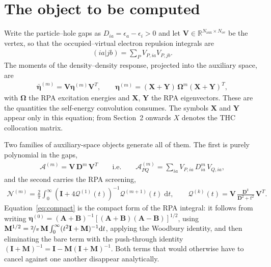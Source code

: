 \documentclass[11pt]{article}
\newcommand{\mat}[1]{{\mathbf{#1}}}
\newcommand{\parth}[1]{\left(#1\right)}
\newcommand{\Dcal}{\mathcal{A}}
\newcommand{\Qcal}{\mathcal{Q}}
\newcommand{\Ncal}{\mathcal{N}}
\begin{document}
\section{The object to be computed}

Write the particle--hole gaps as $D_{ia} = \epsilon_a - \epsilon_i > 0$ and let
$\mat{V} \in \mathbb{R}^{N_{\text{aux}} \times N_{ov}}$ be the vertex, so that the
occupied--virtual electron repulsion integrals are
\begin{align}
    (ia|jb) = \sum_P V_{P,ia} V_{P,jb}.
\end{align}
The moments of the density--density response, projected into the auxiliary space, are
\begin{align}
    \bar{\bm\eta}^{(m)} = \mat{V} \bm\eta^{(m)} \mat{V}^T,
    \qquad
    \bm\eta^{(m)} = (\mat{X}+\mat{Y})\, \bm\Omega^m (\mat{X}+\mat{Y})^T ,
\end{align}
with $\bm\Omega$ the RPA excitation energies and $\mat{X}$, $\mat{Y}$ the RPA
eigenvectors. These are the quantities the self-energy convolution consumes. The symbols
$\mat{X}$ and $\mat{Y}$ appear only in this equation; from Section~2 onwards $X$ denotes
the THC collocation matrix.

Two families of auxiliary-space objects generate all of them. The first is purely
polynomial in the gaps,
\begin{align}
    \Dcal^{(m)} = \mat{V}\, \mat{D}^m\, \mat{V}^T
    \qquad \text{i.e.} \qquad
    \Dcal^{(m)}_{PQ} = \sum_{ia} V_{P,ia}\, D_{ia}^m\, V_{Q,ia} ,
    \label{eq:Dcal}
\end{align}
and the second carries the RPA screening,
\begin{align}
    \Ncal^{(m)}
    = \frac{2}{\pi} \int_0^\infty
      \parth{\mat{I} + 4\Qcal^{(1)}(t)}^{-1} \Qcal^{(m+1)}(t) \; \mathrm{d}t ,
    \qquad
    \Qcal^{(k)}(t) = \mat{V}\, \frac{\mat{D}^{k}}{\mat{D}^2 + t^2}\, \mat{V}^T .
    \label{eq:compact}
\end{align}
Equation~\eqref{eq:compact} is the compact form of the RPA integral: it follows from
writing $\bm\eta^{(0)} = (\mat{A}+\mat{B})^{-1}[(\mat{A}+\mat{B})(\mat{A}-\mat{B})]^{1/2}$,
using $\mat{M}^{1/2} = \nicefrac{2}{\pi}\,\mat{M}\int_0^\infty (t^2\mat{I}+\mat{M})^{-1}
\mathrm{d}t$, applying the Woodbury identity, and then eliminating the bare term with the
push-through identity $(\mat{I}+\mat{M})^{-1} = \mat{I} - \mat{M}(\mat{I}+\mat{M})^{-1}$.
Both terms that would otherwise have to cancel against one another disappear analytically.
\end{document}
